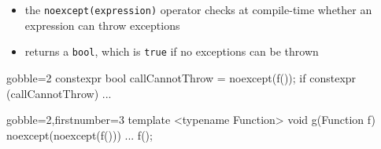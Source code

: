 \begin{advanced}
\begin{frame}[fragile]
  \begin{block}{}
    \begin{itemize}
      \item the \texttt{noexcept(expression)} operator checks at compile-time whether an expression can throw exceptions
      \item returns a \texttt{bool}, which is \texttt{true} if no exceptions can be thrown
    \end{itemize}
  \end{block}
  \begin{block}{}
    \begin{cppcode*}{gobble=2}
      constexpr bool callCannotThrow = noexcept(f());
      if constexpr (callCannotThrow) { ... }
    \end{cppcode*}
  \end{block}
  \begin{block}{}
    \begin{cppcode*}{gobble=2,firstnumber=3}
      template <typename Function>
      void g(Function f) noexcept(noexcept(f())) {
        ...
        f();
      }
    \end{cppcode*}
  \end{block}
\end{frame}


\end{advanced}
